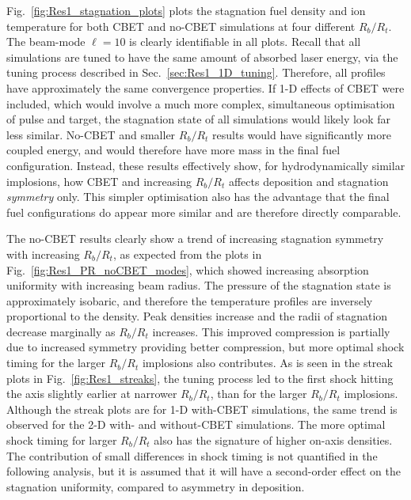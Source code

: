 Fig.~\ref{fig:Res1_stagnation_plots} plots the stagnation fuel density and ion temperature for both \ac{CBET} and no-\ac{CBET} simulations at four different $R_b/R_t$.
The beam-mode $\ell=10$ is clearly identifiable in all plots.
Recall that all simulations are tuned to have the same amount of absorbed laser energy, via the tuning process described in Sec.~\ref{sec:Res1_1D_tuning}.
Therefore, all profiles have approximately the same convergence properties.
If 1-D effects of \ac{CBET} were included, which would involve a much more complex, simultaneous optimisation of pulse and target, the stagnation state of all simulations would likely look far less similar.
No-\ac{CBET} and smaller $R_b/R_t$ results would have significantly more coupled energy, and would therefore have more mass in the final fuel configuration.
Instead, these results effectively show, for hydrodynamically similar implosions, how \ac{CBET} and increasing $R_b/R_t$ affects deposition and stagnation \textit{symmetry} only.
This simpler optimisation also has the advantage that the final fuel configurations do appear more similar and are therefore directly comparable.

The no-\ac{CBET} results clearly show a trend of increasing stagnation symmetry with increasing $R_b/R_t$, as expected from the plots in Fig.~\ref{fig:Res1_PR_noCBET_modes}, which showed increasing absorption uniformity with increasing beam radius.
The pressure of the stagnation state is approximately isobaric, and therefore the temperature profiles are inversely proportional to the density.
Peak densities increase and the radii of stagnation decrease marginally as $R_b/R_t$ increases.
This improved compression is partially due to increased symmetry providing better compression, but more optimal shock timing for the larger $R_b/R_t$ implosions also contributes.
As is seen in the streak plots in Fig.~\ref{fig:Res1_streaks}, the tuning process led to the first shock hitting the axis slightly earlier at narrower $R_b/R_t$, than for the larger $R_b/R_t$ implosions.
Although the streak plots are for 1-D with-\ac{CBET} simulations, the same trend is observed for the 2-D with- and without-\ac{CBET} simulations.
The more optimal shock timing for larger $R_b/R_t$ also has the signature of higher on-axis densities.
The contribution of small differences in shock timing is not quantified in the following analysis, but it is assumed that it will have a second-order effect on the stagnation uniformity, compared to asymmetry in deposition.

